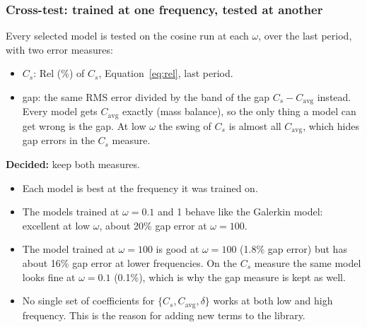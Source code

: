 \documentclass[11pt,a4paper]{article}
\newcommand{\decided}[1]{\textcolor{green!40!black}{\textbf{Decided:} #1}}
\newcommand{\avg}{\mathrm{avg}}
\begin{document}
\subsubsection{Cross-test: trained at one frequency, tested at another}
Every selected model is tested on the cosine run at each $\omega$, over the last period, with two error measures:
\begin{itemize}
  \item $C_s$: Rel (\%) of $C_s$, Equation~\eqref{eq:rel}, last period.
  \item gap: the same RMS error divided by the band of the gap $C_s-C_\avg$ instead. Every model gets $C_\avg$ exactly (mass balance), so the only thing a model can get wrong is the gap. At low $\omega$ the swing of $C_s$ is almost all $C_\avg$, which hides gap errors in the $C_s$ measure.
\end{itemize}
\decided{keep both measures.}
\begin{table}[H]\centering\small\setlength{\tabcolsep}{4pt}

\caption{Cross-test, Rel (\%), cosine flux, last period.}
\end{table}
\begin{itemize}
  \item Each model is best at the frequency it was trained on.
  \item The models trained at $\omega=0.1$ and 1 behave like the Galerkin model: excellent at low $\omega$, about 20\% gap error at $\omega=100$.
  \item The model trained at $\omega=100$ is good at $\omega=100$ (1.8\% gap error) but has about 16\% gap error at lower frequencies. On the $C_s$ measure the same model looks fine at $\omega=0.1$ (0.1\%), which is why the gap measure is kept as well.
  \item No single set of coefficients for $\{C_s, C_\avg, \delta\}$ works at both low and high frequency. This is the reason for adding new terms to the library.
\end{itemize}

\end{document}
